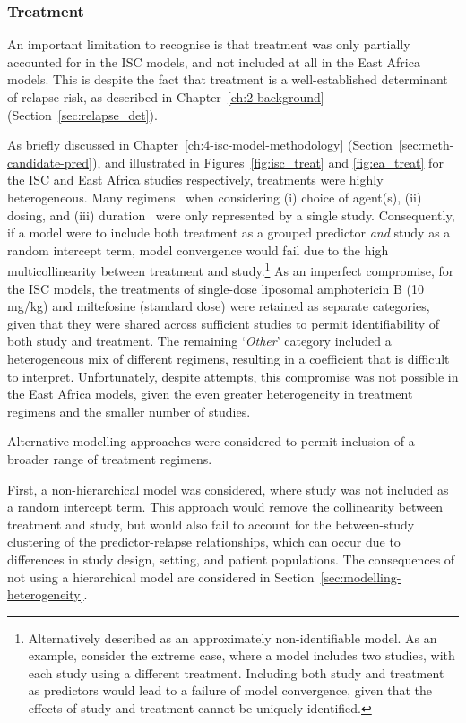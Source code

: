 \subsubsection{Treatment\label{sec:treat_limitations}}

An important limitation to recognise is that treatment was only partially accounted for in the ISC models, and not included at all in the East Africa models. This is despite the fact that treatment is a well-established determinant of relapse risk, as described in Chapter~\ref{ch:2-background} (Section~\ref{sec:relapse_det}).

As briefly discussed in Chapter~\ref{ch:4-isc-model-methodology} (Section~\ref{sec:meth-candidate-pred}), and illustrated in Figures~\ref{fig:isc_treat} and \ref{fig:ea_treat} for the ISC and East Africa studies respectively, treatments were highly heterogeneous. Many regimens \textemdash\ when considering (i) choice of agent(s), (ii) dosing, and (iii) duration \textemdash\ were only represented by a single study. Consequently, if a model were to include both treatment as a grouped predictor \textit{and} study as a random intercept term, model convergence would fail due to the high multicollinearity between treatment and study.\footnote{Alternatively described as an approximately non-identifiable model. As an example, consider the extreme case, where a model includes two studies, with each study using a different treatment. Including both study and treatment as predictors would lead to a failure of model convergence, given that the effects of study and treatment cannot be uniquely identified.} As an imperfect compromise, for the ISC models, the treatments of single-dose liposomal amphotericin B (10 mg/kg) and miltefosine (standard dose) were retained as separate categories, given that they were shared across sufficient studies to permit identifiability of both study and treatment. The remaining `\textit{Other}' category included a heterogeneous mix of different regimens, resulting in a coefficient that is difficult to interpret. Unfortunately, despite attempts, this compromise was not possible in the East Africa models, given the even greater heterogeneity in treatment regimens and the smaller number of studies.

Alternative modelling approaches were considered to permit inclusion of a broader range of treatment regimens.

First, a non-hierarchical model was considered, where study was not included as a random intercept term. This approach would remove the collinearity between treatment and study, but would also fail to account for the between-study clustering of the predictor-relapse relationships, which can occur due to differences in study design, setting, and patient populations. The consequences of not using a hierarchical model are considered in Section~\ref{sec:modelling-heterogeneity}.

